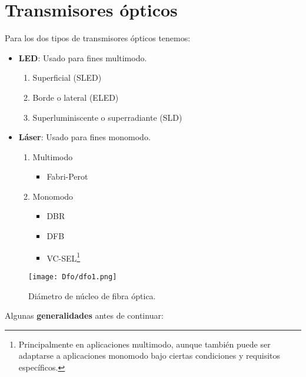\documentclass[12pt,fleqn,a4paper,oneside]{LegrandOrangeBook}
\begin{document}
\chapter{Transmisores ópticos}
Para los dos tipos de transmisores ópticos tenemos:
\begin{itemize}
\item \textbf{LED}: Usado para fines multimodo.
\begin{enumerate}
\item Superficial (SLED)
\item Borde o lateral (ELED)
\item Superluminiscente o superradiante (SLD)
\end{enumerate}

\item \textbf{Láser}: Usado para fines monomodo.
\begin{enumerate}
\item Multimodo
\begin{itemize}
\item Fabri-Perot
\end{itemize}
\item Monomodo
\begin{itemize}
\item DBR
\item DFB
\item VC-SEL\footnote{Principalmente en aplicaciones multimodo, aunque también puede ser adaptarse a aplicaciones monomodo bajo ciertas condiciones y requisitos específicos.}
\end{itemize}
\end{enumerate}
\end{itemize}
\begin{figure}[H]
\centering
\texttt{[image: Dfo/dfo1.png]}
\caption{Diámetro de núcleo de fibra óptica.}
\end{figure}
Algunas \textbf{generalidades} antes de continuar:
\end{document}
